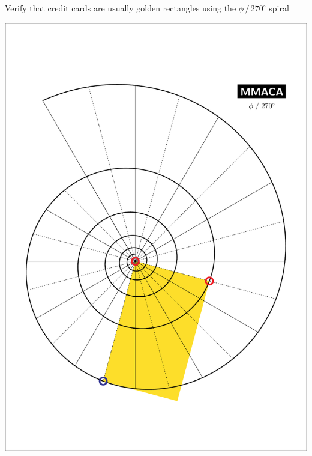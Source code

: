 \documentclass[a4paper,12pt]{article}
\begin{document}
    \begin{center}
    
        \large

        Verify that credit cards are usually golden rectangles using the $\phi \, / \, 270^{\circ}$ spiral

        \bigskip \bigskip \bigskip
    
        \includegraphics[scale=0.7071]{./pictures/Example_08}

    \end{center}

    \newpage

\end{document}
